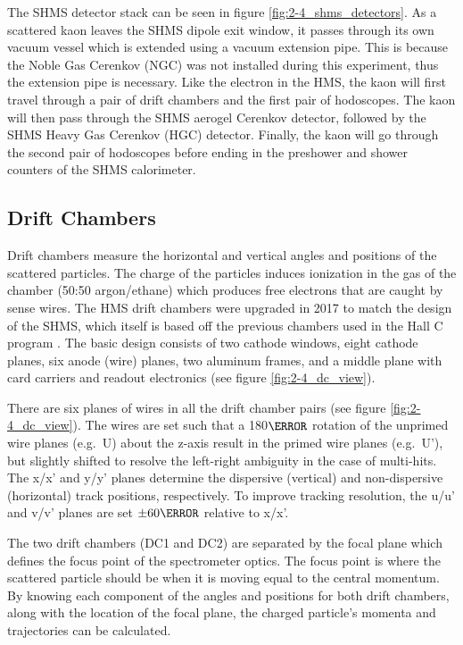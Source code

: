 \documentclass[
]{report}
\begin{document}


The SHMS detector stack can be seen in figure
\ref{fig:2-4_shms_detectors}. As a scattered kaon leaves the SHMS dipole
exit window, it passes through its own vacuum vessel which is extended
using a vacuum extension pipe. This is because the Noble Gas Cerenkov
(NGC) was not installed during this experiment, thus the extension pipe
is necessary. Like the electron in the HMS, the kaon will first travel
through a pair of drift chambers and the first pair of hodoscopes. The
kaon will then pass through the SHMS aerogel Cerenkov detector, followed
by the SHMS Heavy Gas Cerenkov (HGC) detector. Finally, the kaon will go
through the second pair of hodoscopes before ending in the preshower and
shower counters of the SHMS calorimeter.

\hypertarget{drift-chambers}{%
\subsection{Drift Chambers}\label{drift-chambers}}

Drift chambers measure the horizontal and vertical angles and positions
of the scattered particles. The charge of the particles induces
ionization in the gas of the chamber (50:50 argon/ethane) which produces
free electrons that are caught by sense wires. The HMS drift chambers
were upgraded in 2017 to match the design of the SHMS, which itself is
based off the previous chambers used in the Hall C program
\cite{pandey_status_2017} \cite{tang_hall_2017}
\cite{christy_hall_2016}. The basic design consists of two cathode
windows, eight cathode planes, six anode (wire) planes, two aluminum
frames, and a middle plane with card carriers and readout electronics
(see figure \ref{fig:2-4_dc_view}).

There are six planes of wires in all the drift chamber pairs (see figure
\ref{fig:2-4_dc_view}). The wires are set such that a 180\(\degree\)
rotation of the unprimed wire planes (e.g.~U) about the z-axis result in
the primed wire planes (e.g.~U'), but slightly shifted to resolve the
left-right ambiguity in the case of multi-hits. The x/x' and y/y' planes
determine the dispersive (vertical) and non-dispersive (horizontal)
track positions, respectively. To improve tracking resolution, the u/u'
and v/v' planes are set \(\pm60\degree\) relative to x/x'.



The two drift chambers (DC1 and DC2) are separated by the focal plane
which defines the focus point of the spectrometer optics. The focus
point is where the scattered particle should be when it is moving equal
to the central momentum. By knowing each component of the angles and
positions for both drift chambers, along with the location of the focal
plane, the charged particle's momenta and trajectories can be
calculated.
\end{document}
